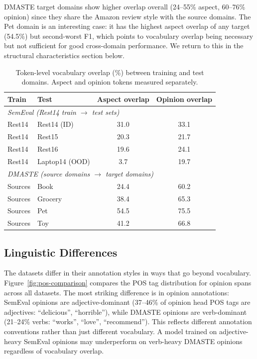 \documentclass[12pt,a4paper]{report}
\begin{document}
DMASTE target domains show higher overlap overall (24--55\% aspect, 60--76\% opinion) since they share the Amazon review style with the source domains. The Pet domain is an interesting case: it has the highest aspect overlap of any target (54.5\%) but second-worst F1, which points to vocabulary overlap being necessary but not sufficient for good cross-domain performance. We return to this in the structural characteristics section below.

\begin{table}[H]
\centering
\caption{Token-level vocabulary overlap (\%) between training and test domains. Aspect and opinion tokens measured separately.}
\label{tab:vocab-overlap}
\small
\begin{tabular}{@{}llcc@{}}
\toprule
\textbf{Train} & \textbf{Test} & \textbf{Aspect overlap} & \textbf{Opinion overlap} \\
\midrule
\multicolumn{4}{l}{\textit{SemEval (Rest14 train $\rightarrow$ test sets)}} \\
\midrule
Rest14 & Rest14 (ID) & 31.0 & 33.1 \\
Rest14 & Rest15 & 20.3 & 21.7 \\
Rest14 & Rest16 & 19.6 & 24.1 \\
Rest14 & Laptop14 (OOD) & 3.7 & 19.7 \\
\midrule
\multicolumn{4}{l}{\textit{DMASTE (source domains $\rightarrow$ target domains)}} \\
\midrule
Sources & Book & 24.4 & 60.2 \\
Sources & Grocery & 38.4 & 65.3 \\
Sources & Pet & 54.5 & 75.5 \\
Sources & Toy & 41.2 & 66.8 \\
\bottomrule
\end{tabular}
\end{table}

\subsection{Linguistic Differences}

The datasets differ in their annotation styles in ways that go beyond vocabulary. Figure~\ref{fig:pos-comparison} compares the POS tag distribution for opinion spans across all datasets. The most striking difference is in opinion annotations: SemEval opinions are adjective-dominant (37--46\% of opinion head POS tags are adjectives: ``delicious'', ``horrible''), while DMASTE opinions are verb-dominant (21--24\% verbs: ``works'', ``love'', ``recommend''). This reflects different annotation conventions rather than just different vocabulary. A model trained on adjective-heavy SemEval opinions may underperform on verb-heavy DMASTE opinions regardless of vocabulary overlap.
\end{document}
